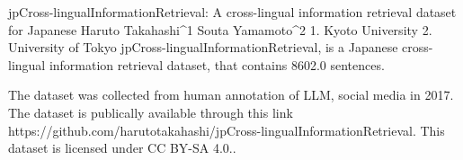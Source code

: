 
jpCross-lingualInformationRetrieval: A cross-lingual information retrieval dataset for Japanese
Haruto Takahashi^1 Souta Yamamoto^2
1. Kyoto University 2. University of Tokyo
jpCross-lingualInformationRetrieval, is a Japanese cross-lingual information retrieval dataset, that contains 8602.0 sentences.

The dataset was collected from human annotation of LLM, social media in 2017. 
The dataset is publically available through this link https://github.com/harutotakahashi/jpCross-lingualInformationRetrieval. This dataset is licensed under CC BY-SA 4.0..

